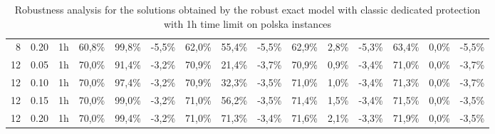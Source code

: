 \documentclass[final,5p,times,twocolumn]{elsarticle}
\begin{document}
\begin{table*}[!htb]
\begin{tabular}{rcccccccccccccc}
8 & 0.20 & 1h &  60,8\% & 99,8\% & -5,5\% & 62,0\% & 55,4\% & -5,5\% & 62,9\% & 2,8\% & -5,3\% & 63,4\% & 0,0\% & -5,5\%  \\ 
12 & 0.05 & 1h & 70,0\% & 91,4\% & -3,2\% & 70,9\% & 21,4\% & -3,7\% & 70,9\% & 0,9\% & -3,4\% & 71,0\% & 0,0\% & -3,7\%  \\
12 & 0.10 & 1h & 70,0\% & 97,4\% & -3,2\% & 70,9\% & 32,3\% & -3,5\% & 71,0\% & 1,0\% & -3,4\% & 71,3\% & 0,0\% & -3,7\%  \\
12 & 0.15 & 1h & 70,0\% & 99,0\% & -3,2\% & 71,0\% & 56,2\% & -3,5\% & 71,4\% & 1,5\% & -3,4\% & 71,5\% & 0,0\% & -3,5\%  \\
12 & 0.20 & 1h & 70,0\% & 99,4\% & -3,2\% & 71,0\% & 71,3\% & -3,4\% & 71,6\% & 2,1\% & -3,3\% & 71,9\% & 0,0\% & -3,5\%  \\
\end{tabular}
\caption{Robustness analysis  for the solutions obtained by the robust exact model with classic dedicated protection  with 1h time limit on polska instances}
\label{tab:polska_model_robust-ded}
\end{table*}
\end{document}

